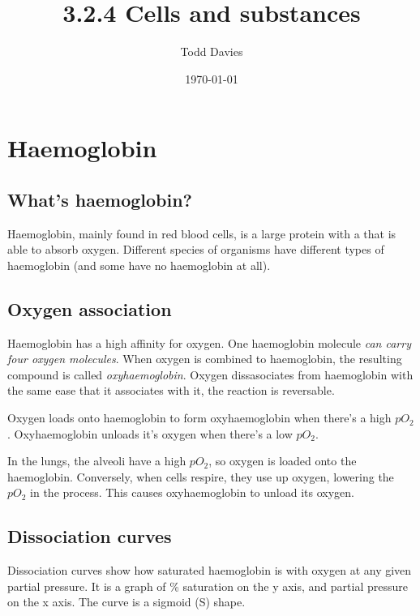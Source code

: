 \documentclass{article}
\author{Todd Davies}
\title{3.2.4 Cells and substances}
\date{\today}
\begin{document}
\lhead{\today}

\maketitle

\section*{Haemoglobin}
\thispagestyle{empty}

\subsection*{What's haemoglobin?}

Haemoglobin, mainly found in red blood cells, is a large protein with a
 that is
able to absorb oxygen. Different species of organisms have different types of
haemoglobin (and some have no haemoglobin at all).

\subsection*{Oxygen association}

Haemoglobin has a high affinity for oxygen. One haemoglobin molecule {\it can
carry four oxygen molecules}. When oxygen is combined to haemoglobin, the
resulting compound is called {\it oxyhaemoglobin}. Oxygen dissasociates from
haemo\-globin with the same ease that it associates with it, the reaction is
reversable.


Oxygen loads onto haemoglobin to form oxyhaemoglobin when there's a high $pO_2$.
Oxyhaemoglobin unloads it's oxygen when there's a low $pO_2$.

In the lungs, the alveoli have a high $pO_2$, so oxygen is loaded onto the
haemoglobin. Conversely, when cells respire, they use up oxygen, lowering the
$pO_2$ in the process. This causes oxyhaemoglobin to unload its oxygen.

\subsection*{Dissociation curves}

Dissociation curves show how saturated haemoglobin is with oxygen at any given
partial pressure. It is a graph of \% saturation on the y axis, and partial
pressure on the x axis. The curve is a sigmoid (S) shape.
\end{document}
